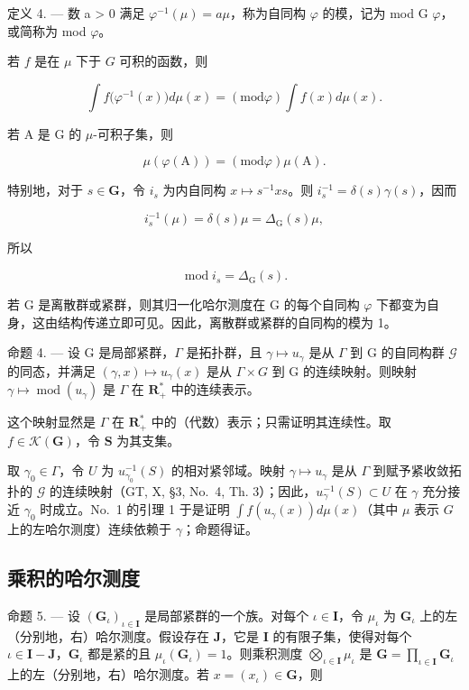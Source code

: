 定义 4. --- 数 a \textgreater{} 0 满足 \(\varphi^{-1}(\mu) = a\mu\)，称为自同构 \(\varphi\) 的模，记为 mod G \(\varphi\)，或简称为 mod \(\varphi\)。

若 \(f\) 是在 \(\mu\) 下于 \(G\) 可积的函数，则

\[
\int f \big (\varphi^ {- 1} (x) \big) d \mu (x) = (\mathrm{mod} \varphi) \int f (x) d \mu (x).\tag{31}
\]

若 A 是 G 的 \(\mu\)-可积子集，则

\[
\mu (\varphi (\mathrm{A})) = (\mathrm{mod} \varphi) \mu (\mathrm{A}).\tag{32}
\]

特别地，对于 \(s \in \mathbf{G}\)，令 \(i_s\) 为内自同构 \(x \mapsto s^{-1}xs\)。则 \(i_s^{-1} = \delta(s)\gamma(s)\)，因而

\[
i _ {s} ^ {- 1} (\mu) = \delta (s) \mu = \Delta_ {\mathrm{G}} (s) \mu ,
\]

所以

\[
\operatorname{mod} i _ {s} = \Delta_ {\mathrm{G}} (s).\tag{33}
\]

若 G 是离散群或紧群，则其归一化哈尔测度在 G 的每个自同构 \(\varphi\) 下都变为自身，这由结构传递立即可见。因此，离散群或紧群的自同构的模为 1。

命题 4. --- 设 G 是局部紧群，\(\Gamma\) 是拓扑群，且 \(\gamma \mapsto u_{\gamma}\) 是从 \(\Gamma\) 到 G 的自同构群 \(\mathcal{G}\) 的同态，并满足 \((\gamma, x) \mapsto u_{\gamma}(x)\) 是从 \(\Gamma \times G\) 到 G 的连续映射。则映射 \(\gamma \mapsto \operatorname{mod}(u_{\gamma})\) 是 \(\Gamma\) 在 \(\mathbf{R}_{+}^{*}\) 中的连续表示。

这个映射显然是 \(\Gamma\) 在 \(\mathbf{R}_+^*\) 中的（代数）表示；只需证明其连续性。取 \(f \in \mathcal{K}(\mathbf{G})\)，令 \(\mathbf{S}\) 为其支集。

取 \(\gamma_0 \in \Gamma\)，令 \(U\) 为 \(u_{\gamma_0}^{-1}(S)\) 的相对紧邻域。映射 \(\gamma \mapsto u_\gamma\) 是从 \(\Gamma\) 到赋予紧收敛拓扑的 \(\mathcal{G}\) 的连续映射（GT, X, §3, No.~4, Th. 3）；因此，\(u_{\gamma}^{-1}(S) \subset U\) 在 \(\gamma\) 充分接近 \(\gamma_0\) 时成立。No.~1 的引理 1 于是证明 \(\int f(u_\gamma(x)) d\mu(x)\)（其中 \(\mu\) 表示 \(G\) 上的左哈尔测度）连续依赖于 \(\gamma\)；命题得证。

\subsection{乘积的哈尔测度}

命题 5. --- 设 \((\mathbf{G}_{\iota})_{\iota \in \mathbf{I}}\) 是局部紧群的一个族。对每个 \(\iota \in \mathbf{I}\)，令 \(\mu_{\iota}\) 为 \(\mathbf{G}_{\iota}\) 上的左（分别地，右）哈尔测度。假设存在 \(\mathbf{J}\)，它是 \(\mathbf{I}\) 的有限子集，使得对每个 \(\iota \in \mathbf{I} - \mathbf{J}\)，\(\mathbf{G}_{\iota}\) 都是紧的且 \(\mu_{\iota}(\mathbf{G}_{\iota}) = 1\)。则乘积测度 \(\bigotimes_{\iota \in \mathbf{I}} \mu_{\iota}\) 是 \(\mathbf{G} = \prod_{\iota \in \mathbf{I}} \mathbf{G}_{\iota}\) 上的左（分别地，右）哈尔测度。若 \(x = (x_{\iota}) \in \mathbf{G}\)，则


